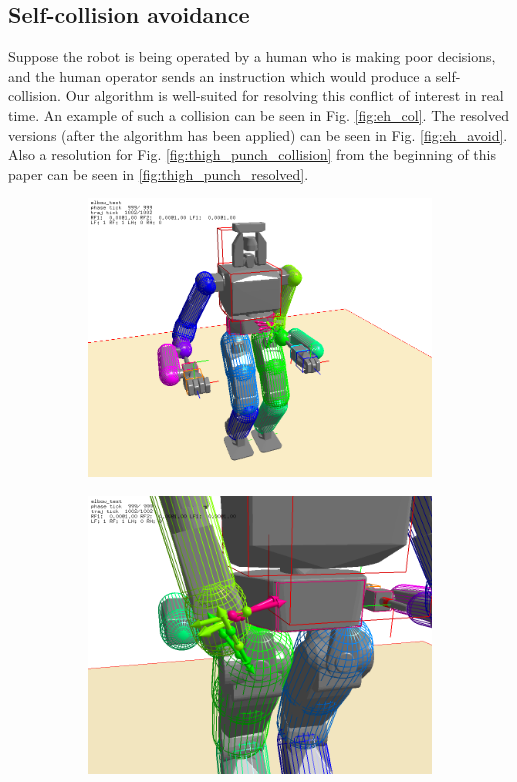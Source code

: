 \documentclass[letterpaper, 10 pt, conference]{ieeeconf}  %
\begin{document}
\subsection{Self-collision avoidance}

Suppose the robot is being operated by a human who is making poor decisions, and the human operator sends an instruction which would produce a self-collision. Our algorithm is well-suited for resolving this conflict of interest in real time. An example of such a collision can be seen in Fig. \ref{fig:eh_col}. The resolved versions (after the algorithm has been applied) can be seen in Fig. \ref{fig:eh_avoid}. Also a resolution for Fig. \ref{fig:thigh_punch_collision} from the beginning of this paper can be seen in \ref{fig:thigh_punch_resolved}.

\begin{figure}[h]
\begin{center}
    \begin{subfigure}[h]{0.45\columnwidth}
        \includegraphics[width=\columnwidth]{pictures/elbow_hip_3}
        \label{fig:eh3}
    \end{subfigure}
    \begin{subfigure}[h]{0.45\columnwidth}
        \includegraphics[width=\columnwidth]{pictures/elbow_hip_4}

\end{subfigure}
\end{center}
\end{figure}
\end{document}
